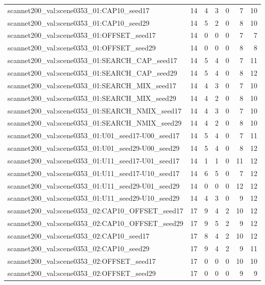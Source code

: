 \begin{table}[t]
\begin{tabular}{lrrrrrr}
scannet200\_val:scene0353\_01:CAP10\_seed17 & 14 & 4 & 3 & 0 & 7 & 10 \\
scannet200\_val:scene0353\_01:CAP10\_seed29 & 14 & 5 & 2 & 0 & 8 & 10 \\
scannet200\_val:scene0353\_01:OFFSET\_seed17 & 14 & 0 & 0 & 0 & 7 & 7 \\
scannet200\_val:scene0353\_01:OFFSET\_seed29 & 14 & 0 & 0 & 0 & 8 & 8 \\
scannet200\_val:scene0353\_01:SEARCH\_CAP\_seed17 & 14 & 5 & 4 & 0 & 7 & 11 \\
scannet200\_val:scene0353\_01:SEARCH\_CAP\_seed29 & 14 & 5 & 4 & 0 & 8 & 12 \\
scannet200\_val:scene0353\_01:SEARCH\_MIX\_seed17 & 14 & 4 & 3 & 0 & 7 & 10 \\
scannet200\_val:scene0353\_01:SEARCH\_MIX\_seed29 & 14 & 4 & 2 & 0 & 8 & 10 \\
scannet200\_val:scene0353\_01:SEARCH\_NMIX\_seed17 & 14 & 4 & 3 & 0 & 7 & 10 \\
scannet200\_val:scene0353\_01:SEARCH\_NMIX\_seed29 & 14 & 4 & 2 & 0 & 8 & 10 \\
scannet200\_val:scene0353\_01:U01\_seed17-U00\_seed17 & 14 & 5 & 4 & 0 & 7 & 11 \\
scannet200\_val:scene0353\_01:U01\_seed29-U00\_seed29 & 14 & 5 & 4 & 0 & 8 & 12 \\
scannet200\_val:scene0353\_01:U11\_seed17-U01\_seed17 & 14 & 1 & 1 & 0 & 11 & 12 \\
scannet200\_val:scene0353\_01:U11\_seed17-U10\_seed17 & 14 & 6 & 5 & 0 & 7 & 12 \\
scannet200\_val:scene0353\_01:U11\_seed29-U01\_seed29 & 14 & 0 & 0 & 0 & 12 & 12 \\
scannet200\_val:scene0353\_01:U11\_seed29-U10\_seed29 & 14 & 4 & 3 & 0 & 9 & 12 \\
scannet200\_val:scene0353\_02:CAP10\_OFFSET\_seed17 & 17 & 9 & 4 & 2 & 10 & 12 \\
scannet200\_val:scene0353\_02:CAP10\_OFFSET\_seed29 & 17 & 9 & 5 & 2 & 9 & 12 \\
scannet200\_val:scene0353\_02:CAP10\_seed17 & 17 & 8 & 4 & 2 & 10 & 12 \\
scannet200\_val:scene0353\_02:CAP10\_seed29 & 17 & 9 & 4 & 2 & 9 & 11 \\
scannet200\_val:scene0353\_02:OFFSET\_seed17 & 17 & 0 & 0 & 0 & 10 & 10 \\
scannet200\_val:scene0353\_02:OFFSET\_seed29 & 17 & 0 & 0 & 0 & 9 & 9 \\

\end{tabular}
\end{table}
